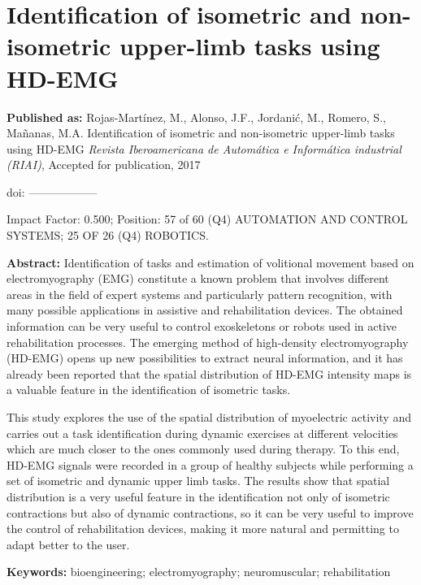 \newpage
{}


\chapter[Isometric and non-isometric task identification]{Identification of isometric and non-isometric upper-limb tasks using HD-EMG}
\label{RIAI}
\textbf{Published as:} 
Rojas-Mart\'inez, M., Alonso, J.F., Jordani\'c, M., Romero, S., Ma\~nanas, M.A.
Identification of isometric and non-isometric upper-limb tasks using HD-EMG 
\textit{Revista Iberoamericana de Autom\'atica e Inform\'atica industrial (RIAI)}, Accepted for publication, 2017

doi: ------------------

Impact Factor: 0.500; Position: 57 of 60 (Q4) AUTOMATION AND CONTROL SYSTEMS; 25 OF 26 (Q4) ROBOTICS.


\textbf{Abstract:} Identification of tasks and estimation of volitional movement based on electromyography (EMG) constitute a known problem that involves different areas in the field of expert systems and particularly pattern recognition, with many possible applications in assistive and rehabilitation devices. The obtained information can be very useful to control exoskeletons or robots used in active rehabilitation processes. The emerging method of high-density electromyography (HD-EMG) opens up new possibilities to extract neural information, and it has already been reported that the spatial distribution of HD-EMG intensity maps is a valuable feature in the identification of isometric tasks.

This study explores the use of the spatial distribution of myoelectric activity and carries out a task identification during dynamic exercises at different velocities which are much closer to the ones commonly used during therapy. To this end, HD-EMG signals were recorded in a group of healthy subjects while performing a set of isometric and dynamic upper limb tasks. The results show that spatial distribution is a very useful feature in the identification not only of isometric contractions but also of dynamic contractions, so it can be very useful to improve the control of rehabilitation devices, making it more natural and permitting to adapt better to the user.

\textbf{Keywords:}  bioengineering; electromyography; neuromuscular; rehabilitation

